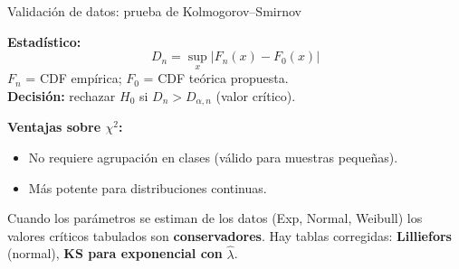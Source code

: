 \documentclass[aspectratio=1610, 10pt]{beamer}
\begin{document}
\begin{frame}{Validación de datos: prueba de Kolmogorov--Smirnov}
  \begin{definicionbox}[Prueba KS]
    \footnotesize
    \textbf{Estadístico:}
    \[
      D_n = \sup_x \big| F_n(x) - F_0(x) \big|
    \]
    $F_n$ = CDF empírica; $F_0$ = CDF teórica propuesta.\\
    \textbf{Decisión:} rechazar $H_0$ si $D_n > D_{\alpha,n}$ (valor crítico).
  \end{definicionbox}

  \vspace{4pt}
  \footnotesize
  \textbf{Ventajas sobre $\chi^2$:}
  \begin{itemize}\itemsep1pt
    \item No requiere agrupación en clases (válido para muestras pequeñas).
    \item Más potente para distribuciones continuas.
  \end{itemize}

  \vspace{4pt}
  \begin{alertabox}[Limitación]
    \footnotesize
    Cuando los parámetros se estiman de los datos (Exp, Normal, Weibull) los
    valores críticos tabulados son \textbf{conservadores}. Hay tablas corregidas:
    \textbf{Lilliefors} (normal), \textbf{KS para exponencial con} $\hat\lambda$.
  \end{alertabox}
\end{frame}
\end{document}
